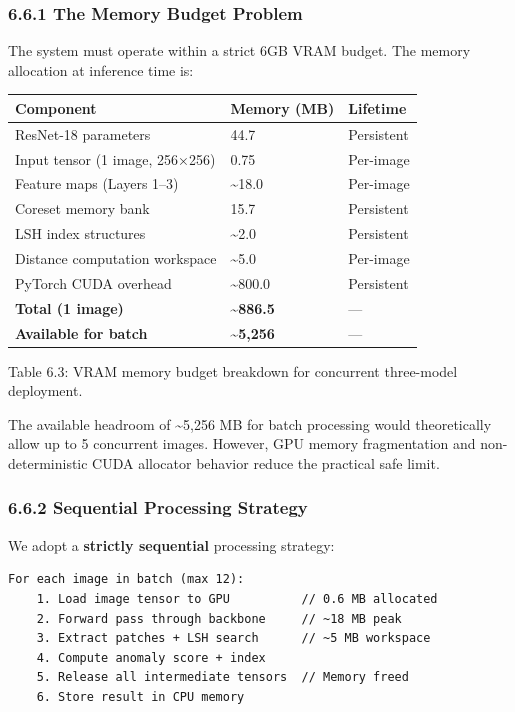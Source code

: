 \subsubsection{6.6.1 The Memory Budget Problem}\label{the-memory-budget-problem}

The system must operate within a strict 6GB VRAM budget. The memory allocation at inference time is:

\begin{longtable}[]{@{}lll@{}}
\toprule\noalign{}
Component & Memory (MB) & Lifetime \\
\midrule\noalign{}
\endhead
\bottomrule\noalign{}
\endlastfoot
ResNet-18 parameters & 44.7 & Persistent \\
Input tensor (1 image, 256×256) & 0.75 & Per-image \\
Feature maps (Layers 1--3) & \textasciitilde18.0 & Per-image \\
Coreset memory bank & 15.7 & Persistent \\
LSH index structures & \textasciitilde2.0 & Persistent \\
Distance computation workspace & \textasciitilde5.0 & Per-image \\
PyTorch CUDA overhead & \textasciitilde800.0 & Persistent \\
\textbf{Total (1 image)} & \textbf{\textasciitilde886.5} & --- \\
\textbf{Available for batch} & \textbf{\textasciitilde5,256} & --- \\
\end{longtable}

Table 6.3: VRAM memory budget breakdown for concurrent three-model deployment.

The available headroom of \textasciitilde5,256 MB for batch processing would theoretically allow up to 5 concurrent images. However, GPU memory fragmentation and non-deterministic CUDA allocator behavior reduce the practical safe limit.

\subsubsection{6.6.2 Sequential Processing Strategy}\label{sequential-processing-strategy}

We adopt a \textbf{strictly sequential} processing strategy:

\begin{verbatim}
For each image in batch (max 12):
    1. Load image tensor to GPU          // 0.6 MB allocated
    2. Forward pass through backbone     // ~18 MB peak
    3. Extract patches + LSH search      // ~5 MB workspace
    4. Compute anomaly score + index
    5. Release all intermediate tensors  // Memory freed
    6. Store result in CPU memory
\end{verbatim}

